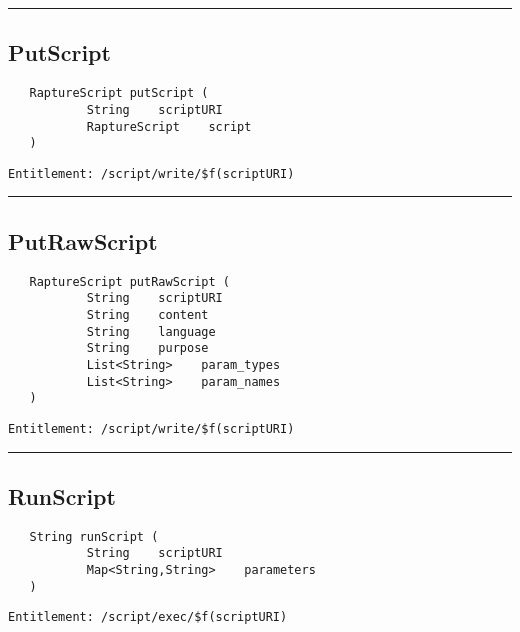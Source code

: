 \rule{12cm}{2pt}
\subsection{PutScript}
\label{Api:PutScript}
\begin{verbatim}
   RaptureScript putScript (
           String    scriptURI
           RaptureScript    script
   )
\end{verbatim}
\begin{Verbatim}[fontsize=\small, formatcom=\color{Maroon}]
  Entitlement: /script/write/$f(scriptURI)
\end{Verbatim}



\rule{12cm}{2pt}
\subsection{PutRawScript}
\label{Api:PutRawScript}
\begin{verbatim}
   RaptureScript putRawScript (
           String    scriptURI
           String    content
           String    language
           String    purpose
           List<String>    param_types
           List<String>    param_names
   )
\end{verbatim}
\begin{Verbatim}[fontsize=\small, formatcom=\color{Maroon}]
  Entitlement: /script/write/$f(scriptURI)
\end{Verbatim}



\rule{12cm}{2pt}
\subsection{RunScript}
\label{Api:RunScript}
\begin{verbatim}
   String runScript (
           String    scriptURI
           Map<String,String>    parameters
   )
\end{verbatim}
\begin{Verbatim}[fontsize=\small, formatcom=\color{Maroon}]
  Entitlement: /script/exec/$f(scriptURI)
\end{Verbatim}




